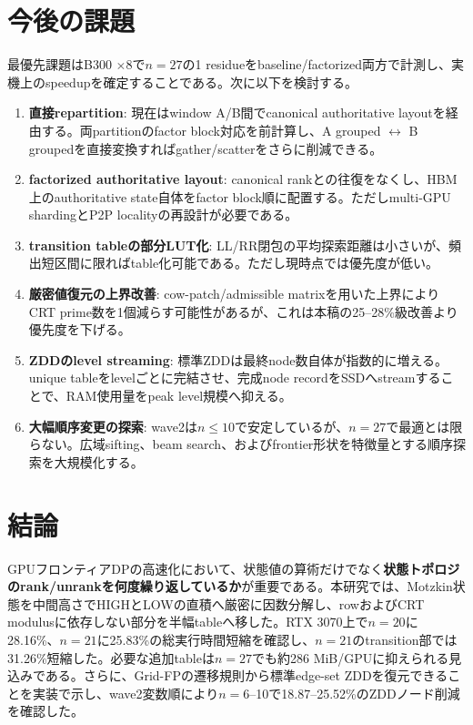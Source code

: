 \documentclass[a4paper,10pt,twocolumn]{ltjsarticle}
\begin{document}
\section{今後の課題}
最優先課題はB300 $\times8$で$n=27$の1 residueをbaseline/factorized両方で計測し、実機上のspeedupを確定することである。次に以下を検討する。
\begin{enumerate}
  \item \textbf{直接repartition}: 現在はwindow A/B間でcanonical authoritative layoutを経由する。両partitionのfactor block対応を前計算し、A grouped $\leftrightarrow$ B groupedを直接変換すればgather/scatterをさらに削減できる。
  \item \textbf{factorized authoritative layout}: canonical rankとの往復をなくし、HBM上のauthoritative state自体をfactor block順に配置する。ただしmulti-GPU shardingとP2P localityの再設計が必要である。
  \item \textbf{transition tableの部分LUT化}: LL/RR閉包の平均探索距離は小さいが、頻出短区間に限ればtable化可能である。ただし現時点では優先度が低い。
  \item \textbf{厳密値復元の上界改善}: cow-patch/admissible matrixを用いた上界によりCRT prime数を1個減らす可能性があるが、これは本稿の25--28\%級改善より優先度を下げる。
  \item \textbf{ZDDのlevel streaming}: 標準ZDDは最終node数自体が指数的に増える。unique tableをlevelごとに完結させ、完成node recordをSSDへstreamすることで、RAM使用量をpeak level規模へ抑える。
  \item \textbf{大幅順序変更の探索}: wave2は$n\le10$で安定しているが、$n=27$で最適とは限らない。広域sifting、beam search、およびfrontier形状を特徴量とする順序探索を大規模化する。
\end{enumerate}

\section{結論}
GPUフロンティアDPの高速化において、状態値の算術だけでなく\textbf{状態トポロジのrank/unrankを何度繰り返しているか}が重要である。本研究では、Motzkin状態を中間高さでHIGHとLOWの直積へ厳密に因数分解し、rowおよびCRT modulusに依存しない部分を半幅tableへ移した。RTX 3070上で$n=20$に28.16\%、$n=21$に25.83\%の総実行時間短縮を確認し、$n=21$のtransition部では31.26\%短縮した。必要な追加tableは$n=27$でも約286 MiB/GPUに抑えられる見込みである。さらに、Grid-FPの遷移規則から標準edge-set ZDDを復元できることを実装で示し、wave2変数順により$n=6$--10で18.87--25.52\%のZDDノード削減を確認した。
\end{document}

